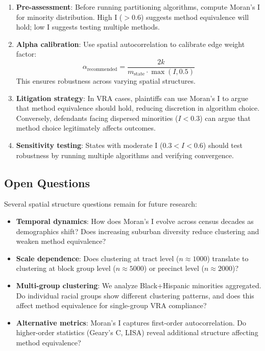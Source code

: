 \begin{enumerate}
    \item \textbf{Pre-assessment}: Before running partitioning algorithms, compute Moran's I for minority distribution. High I ($> 0.6$) suggests method equivalence will hold; low I suggests testing multiple methods.

    \item \textbf{Alpha calibration}: Use spatial autocorrelation to calibrate edge weight factor:
    \[
    \alpha_{\text{recommended}} = \frac{2k}{m_{\text{state}} \cdot \max(I, 0.5)}
    \]
    This ensures robustness across varying spatial structures.

    \item \textbf{Litigation strategy}: In VRA cases, plaintiffs can use Moran's I to argue that method equivalence should hold, reducing discretion in algorithm choice. Conversely, defendants facing dispersed minorities ($I < 0.3$) can argue that method choice legitimately affects outcomes.

    \item \textbf{Sensitivity testing}: States with moderate I ($0.3 < I < 0.6$) should test robustness by running multiple algorithms and verifying convergence.
\end{enumerate}

\subsection{Open Questions}

Several spatial structure questions remain for future research:

\begin{itemize}
    \item \textbf{Temporal dynamics}: How does Moran's I evolve across census decades as demographics shift? Does increasing suburban diversity reduce clustering and weaken method equivalence?

    \item \textbf{Scale dependence}: Does clustering at tract level ($n \approx 1000$) translate to clustering at block group level ($n \approx 5000$) or precinct level ($n \approx 2000$)?

    \item \textbf{Multi-group clustering}: We analyze Black+Hispanic minorities aggregated. Do individual racial groups show different clustering patterns, and does this affect method equivalence for single-group VRA compliance?

    \item \textbf{Alternative metrics}: Moran's I captures first-order autocorrelation. Do higher-order statistics (Geary's C, LISA) reveal additional structure affecting method equivalence?
\end{itemize}

